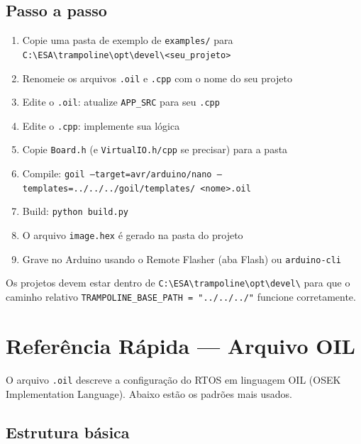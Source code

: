 \documentclass[12pt,a4paper]{article}
\begin{document}
\subsection{Passo a passo}

\begin{enumerate}[nosep]
  \item Copie uma pasta de exemplo de \texttt{examples/} para\\ \texttt{C:\textbackslash ESA\textbackslash trampoline\textbackslash opt\textbackslash devel\textbackslash <seu\_projeto>}
  \item Renomeie os arquivos \texttt{.oil} e \texttt{.cpp} com o nome do seu projeto
  \item Edite o \texttt{.oil}: atualize \texttt{APP\_SRC} para seu \texttt{.cpp}
  \item Edite o \texttt{.cpp}: implemente sua lógica
  \item Copie \texttt{Board.h} (e \texttt{VirtualIO.h/cpp} se precisar) para a pasta
  \item Compile: \texttt{goil --target=avr/arduino/nano --templates=../../../goil/templates/ <nome>.oil}
  \item Build: \texttt{python build.py}
  \item O arquivo \texttt{image.hex} é gerado na pasta do projeto
  \item Grave no Arduino usando o Remote Flasher (aba Flash) ou \texttt{arduino-cli}
\end{enumerate}

\begin{notabox}[Importante]
Os projetos devem estar dentro de \texttt{C:\textbackslash ESA\textbackslash trampoline\textbackslash opt\textbackslash devel\textbackslash} para que o caminho relativo \texttt{TRAMPOLINE\_BASE\_PATH = "../../../"} funcione corretamente.
\end{notabox}

\section{Referência Rápida --- Arquivo OIL}

O arquivo \texttt{.oil} descreve a configuração do RTOS em linguagem OIL (OSEK Implementation Language). Abaixo estão os padrões mais usados.

\subsection{Estrutura básica}
\end{document}
